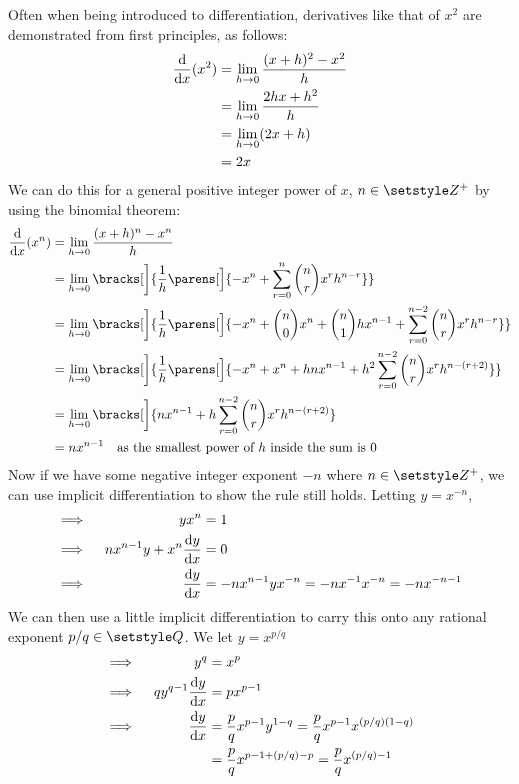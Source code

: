 Often when being introduced to differentiation, derivatives like that of
\(x^2\) are demonstrated from first principles, as follows:
\begin{align*}
 \dv{x}(x^2) &= \lim_{h \to 0} \frac{(x + h)^2 - x^2} h \\
             &= \lim_{h \to 0} \frac{2hx + h^2} h \\
             &= \lim_{h \to 0} (2x + h) \\
             &= 2x
\end{align*}
We can do this for a general positive integer power of \(x\),
\(n \in \Integers^+\) by using the binomial theorem:
\begin{align*}
 \dv{x}(x^n) &= \lim_{h \to 0} \frac{(x + h)^n - x^n} h \\
             &= \lim_{h \to 0} \bracks[\bigg]{\frac 1h \parens[\Big]{-x^n
                     + \sum_{r = 0}^n \binom nr x^r h^{n - r}}} \\
             &= \lim_{h \to 0} \bracks[\bigg]{\frac 1h \parens[\Big]{
                       -x^n + \binom n0 x^n + \binom n1 hx^{n - 1}
                       + \sum_{r = 0}^{n - 2}
               \binom nr x^r h^{n - r}}} \\
             &= \lim_{h \to 0} \bracks[\bigg]{\frac 1h \parens[\Big]{-x^n + x^n
                         + hnx^{n - 1} + h^2 \sum_{r = 0}^{n - 2}
               \binom nr x^r h^{n - (r + 2)}}} \\
             &= \lim_{h \to 0} \bracks[\bigg]{nx^{n - 1} + h \sum_{r = 0}^{n - 2}
               \binom nr x^r h^{n - (r + 2)}} \\
             &= nx^{n-1}\quad
               \text{as the smallest power of \(h\) inside the sum is 0}
\end{align*}
Now if we have some negative integer exponent \(-n\) where
\(n \in \Integers^+\), we can use implicit differentiation to show the rule
still holds. Letting \(y = x^{-n}\),
\begin{alignat*}{2}
 \implies{}&& yx^n &= 1 \\
 \implies{}&& nx^{n - 1}y + x^n \dv<y>{x} &= 0 \\
 \implies{}&& \dv<y>{x} &= -nx^{n - 1}yx^{-n}
     = -nx^{-1}x^{-n} = -nx^{-n - 1}
\end{alignat*}
We can then use a little implicit differentiation to carry this onto any
rational exponent \(p / q \in \Rationals\). We let \(y = x^{p / q}\)
\begin{alignat*}{2}
 \implies{}&& y^q &= x^p \\
 \implies{}&& qy^{q - 1}\dv<y>{x} &= px^{p - 1} \\
 \implies{}&& \dv<y>{x} &= \frac pq x^{p - 1}y^{1 - q}
     = \frac pq x^{p - 1}x^{(p / q)(1 - q)} \\
 &&  &= \frac pq x^{p - 1 + (p / q) - p}
     = \frac pq x^{(p / q) - 1}
\end{alignat*}

